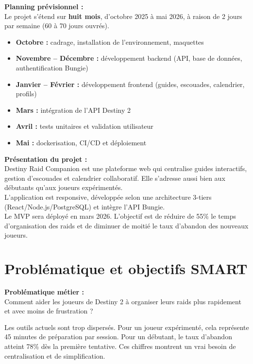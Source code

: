 \vspace{0.5em}

\textbf{Planning prévisionnel :} \\
Le projet s'étend sur \textbf{huit mois}, d'octobre 2025 à mai 2026, à raison de 2 jours par semaine (60 à 70 jours ouvrés).

\begin{itemize}
    \itemsep0.3em
    \item \textbf{Octobre :} cadrage, installation de l'environnement, maquettes
    \item \textbf{Novembre – Décembre :} développement backend (API, base de données, authentification Bungie)
    \item \textbf{Janvier – Février :} développement frontend (guides, escouades, calendrier, profils)
    \item \textbf{Mars :} intégration de l'API Destiny 2
    \item \textbf{Avril :} tests unitaires et validation utilisateur
    \item \textbf{Mai :} dockerisation, CI/CD et déploiement
\end{itemize}

\vspace{0.5em}

\textbf{Présentation du projet :} \\
Destiny Raid Companion est une plateforme web qui centralise guides interactifs, gestion d'escouades et calendrier collaboratif. Elle s'adresse aussi bien aux débutants qu'aux joueurs expérimentés. \\
L'application est responsive, développée selon une architecture 3-tiers (React/Node.js/PostgreSQL) et intègre l'API Bungie. \\
Le MVP sera déployé en mars 2026. L'objectif est de réduire de 55\% le temps d'organisation des raids et de diminuer de moitié le taux d'abandon des nouveaux joueurs.

\section{Problématique et objectifs SMART}

\textbf{Problématique métier :} \\
Comment aider les joueurs de Destiny 2 à organiser leurs raids plus rapidement et avec moins de frustration ?

\vspace{0.5em}

Les outils actuels sont trop dispersés. Pour un joueur expérimenté, cela représente 45 minutes de préparation par session. Pour un débutant, le taux d'abandon atteint 78\% dès la première tentative. Ces chiffres montrent un vrai besoin de centralisation et de simplification.

